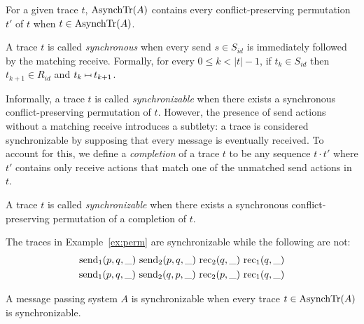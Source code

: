 \begin{lemma}
For a given trace $t$, $\mathrm{AsynchTr}({A})$ contains every conflict-preserving permutation $t'$ of $t$ when $t\in \mathrm{AsynchTr}({A})$.
\end{lemma}

A trace $t$ is called \emph{synchronous} when every send $s\in S_{id}$ is immediately followed by the matching receive. Formally, for every $0\leq k< |t| -1$, if $t_k\in S_{id}$ then $t_{k+1}\in R_{id}$ and $t_{k}\match t_{k+1}$.

Informally, a trace  $t$ is called \emph{synchronizable} when there exists a synchronous conflict-preserving permutation of $t$. 
However, the presence of send actions without a matching receive introduces a subtlety: a trace is considered synchronizable by supposing that every message is eventually received.
To account for this, we define a \emph{completion} of a trace $t$ to be any sequence $t\cdot t'$ where $t'$ contains only receive actions that match one of the unmatched send actions in $t$.

\begin{definition}
A trace $t$ is called \emph{synchronizable} when there exists a synchronous conflict-preserving permutation of a completion of $t$. 
\end{definition}

\begin{example}
The traces in Example~\ref{ex:perm} are synchronizable while the following are not:
\begin{align*}
\send{1}{p,q,\_}\ 
\send{2}{p,q,\_}\ 
\rec{2}{q,\_}\ 
\rec{1}{q,\_} \\
\send{1}{p,q,\_}\ 
\send{2}{q,p,\_}\ 
\rec{2}{p,\_}\ 
\rec{1}{q,\_} 
\end{align*}
\end{example}

A message passing system $A$ is synchronizable when every trace $t\in \mathrm{AsynchTr}({A})$ is  synchronizable.

